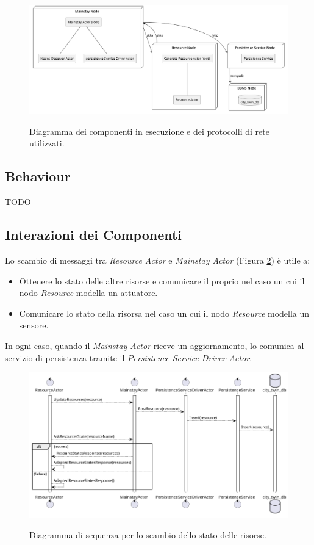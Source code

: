 \documentclass{scrartcl}
\begin{document}
\begin{figure}[h]
    \caption{Diagramma dei componenti in esecuzione e dei protocolli di rete utilizzati.}
    \includegraphics[width=\textwidth]{../assets/images/nodes-component-diagram.png}
    \label{fig:nodes-component-diagram}
\end{figure}

\subsection{Behaviour}

TODO

\subsection{Interazioni dei Componenti}

Lo scambio di messaggi tra \textit{Resource Actor} e \textit{Mainstay Actor} (Figura \ref{fig:core-resource-state-exchange-sequence-diagram}) è utile a:
\begin{itemize}
    \item Ottenere lo stato delle altre risorse e comunicare il proprio nel caso un cui il nodo \textit{Resource} modella un attuatore.
    \item Comunicare lo stato della risorsa nel caso un cui il nodo \textit{Resource} modella un sensore.
\end{itemize}

In ogni caso, quando il \textit{Mainstay Actor} riceve un aggiornamento, lo comunica al servizio di persistenza tramite il \textit{Persistence Service Driver Actor}.

\begin{figure}[h]
    \caption{Diagramma di sequenza per lo scambio dello stato delle risorse.}
    \includegraphics[width=\textwidth]{../assets/images/core-resource-state-exchange-sequence-diagram.png}
    \label{fig:core-resource-state-exchange-sequence-diagram}
\end{figure}
\end{document}

